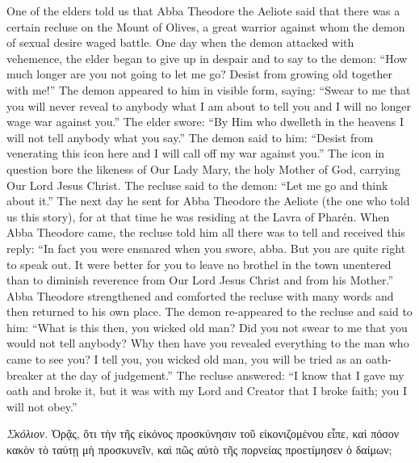 \documentclass[10pt]{book}
\newcommand{\switchGreek}[1][]{\selectlanguage{polutonikogreek} \switchcolumn*[#1]}
\newcommand{\switchEnglish}{\selectlanguage{english} \switchcolumn}
\begin{document}
\begin{paracol}{2}
One of the elders told us that Abba Theodore the Aeliote said that
there was a certain recluse on the Mount of Olives,
a great warrior against whom the demon of sexual desire waged battle.
One day when the demon attacked with vehemence,
the elder began to give up in despair and to say to the demon:
``How much longer are you not going to let me go?
Desist from growing old together with me!''
The demon appeared to him in visible form, saying:
``Swear to me that you will never reveal to anybody what
I am about to tell you and I will no longer wage war against you.''
The elder swore:
``By Him who dwelleth in the heavens I will not tell anybody what you say.''
The demon said to him:
``Desist from venerating this icon here
and I will call off my war against you.''
The icon in question bore the likeness of Our Lady Mary,
the holy Mother of God, carrying Our Lord Jesus Christ.
The recluse said to the demon: ``Let me go and think about it.''
The next day he sent for Abba Theodore the Aeliote
(the one who told us this story), for at that time he
was residing at the Lavra of Pharén. When Abba Theodore came, the recluse told
him all there was to tell and received this reply: ``In fact you were ensnared
when you swore, abba. But you are quite right to speak out. It were better for
you to leave no brothel in the town unentered than to diminish reverence from
Our Lord Jesus Christ and from his Mother.'' Abba Theodore strengthened and
comforted the recluse with many words and then returned to his own place. The
demon re-appeared to the recluse and said to him: ``What is this then, you
wicked old man? Did you not swear to me that you would not tell anybody? Why
then have you revealed everything to the man who came to see you? I tell you,
you wicked old man, you will be tried as an oath-breaker at the day of
judgement.'' The recluse answered: ``I know that I gave my oath and broke it,
but it was with my Lord and Creator that I broke faith; you I will not obey.''

\switchGreek

\emph{Σκόλιον.} Ὁρᾷς, ὅτι τὴν τῆς εἰκόνος προσκύνησιν τοῦ εἰκονιζομένου εἶπε, καὶ πόσον κακὸν τὸ ταύτῃ μὴ προσκυνεῖν, καὶ πῶς αὐτὸ τῆς πορνείας προετίμησεν ὁ δαίμων;

\switchEnglish


\end{paracol}
\end{document}
